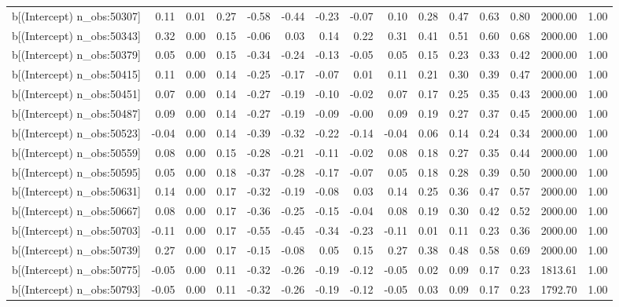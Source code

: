 \begin{table}[ht]
\begin{tabular}{rrrrrrrrrrrrrrr}
  b[(Intercept) n\_obs:50307] & 0.11 & 0.01 & 0.27 & -0.58 & -0.44 & -0.23 & -0.07 & 0.10 & 0.28 & 0.47 & 0.63 & 0.80 & 2000.00 & 1.00 \\ 
  b[(Intercept) n\_obs:50343] & 0.32 & 0.00 & 0.15 & -0.06 & 0.03 & 0.14 & 0.22 & 0.31 & 0.41 & 0.51 & 0.60 & 0.68 & 2000.00 & 1.00 \\ 
  b[(Intercept) n\_obs:50379] & 0.05 & 0.00 & 0.15 & -0.34 & -0.24 & -0.13 & -0.05 & 0.05 & 0.15 & 0.23 & 0.33 & 0.42 & 2000.00 & 1.00 \\ 
  b[(Intercept) n\_obs:50415] & 0.11 & 0.00 & 0.14 & -0.25 & -0.17 & -0.07 & 0.01 & 0.11 & 0.21 & 0.30 & 0.39 & 0.47 & 2000.00 & 1.00 \\ 
  b[(Intercept) n\_obs:50451] & 0.07 & 0.00 & 0.14 & -0.27 & -0.19 & -0.10 & -0.02 & 0.07 & 0.17 & 0.25 & 0.35 & 0.43 & 2000.00 & 1.00 \\ 
  b[(Intercept) n\_obs:50487] & 0.09 & 0.00 & 0.14 & -0.27 & -0.19 & -0.09 & -0.00 & 0.09 & 0.19 & 0.27 & 0.37 & 0.45 & 2000.00 & 1.00 \\ 
  b[(Intercept) n\_obs:50523] & -0.04 & 0.00 & 0.14 & -0.39 & -0.32 & -0.22 & -0.14 & -0.04 & 0.06 & 0.14 & 0.24 & 0.34 & 2000.00 & 1.00 \\ 
  b[(Intercept) n\_obs:50559] & 0.08 & 0.00 & 0.15 & -0.28 & -0.21 & -0.11 & -0.02 & 0.08 & 0.18 & 0.27 & 0.35 & 0.44 & 2000.00 & 1.00 \\ 
  b[(Intercept) n\_obs:50595] & 0.05 & 0.00 & 0.18 & -0.37 & -0.28 & -0.17 & -0.07 & 0.05 & 0.18 & 0.28 & 0.39 & 0.50 & 2000.00 & 1.00 \\ 
  b[(Intercept) n\_obs:50631] & 0.14 & 0.00 & 0.17 & -0.32 & -0.19 & -0.08 & 0.03 & 0.14 & 0.25 & 0.36 & 0.47 & 0.57 & 2000.00 & 1.00 \\ 
  b[(Intercept) n\_obs:50667] & 0.08 & 0.00 & 0.17 & -0.36 & -0.25 & -0.15 & -0.04 & 0.08 & 0.19 & 0.30 & 0.42 & 0.52 & 2000.00 & 1.00 \\ 
  b[(Intercept) n\_obs:50703] & -0.11 & 0.00 & 0.17 & -0.55 & -0.45 & -0.34 & -0.23 & -0.11 & 0.01 & 0.11 & 0.23 & 0.36 & 2000.00 & 1.00 \\ 
  b[(Intercept) n\_obs:50739] & 0.27 & 0.00 & 0.17 & -0.15 & -0.08 & 0.05 & 0.15 & 0.27 & 0.38 & 0.48 & 0.58 & 0.69 & 2000.00 & 1.00 \\ 
  b[(Intercept) n\_obs:50775] & -0.05 & 0.00 & 0.11 & -0.32 & -0.26 & -0.19 & -0.12 & -0.05 & 0.02 & 0.09 & 0.17 & 0.23 & 1813.61 & 1.00 \\ 
  b[(Intercept) n\_obs:50793] & -0.05 & 0.00 & 0.11 & -0.32 & -0.26 & -0.19 & -0.12 & -0.05 & 0.03 & 0.09 & 0.17 & 0.23 & 1792.70 & 1.00 \\ 

\end{tabular}
\end{table}
